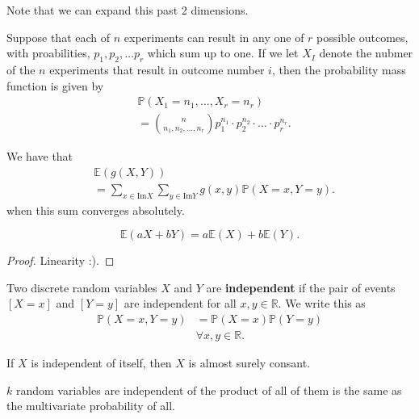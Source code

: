Note that we can expand this past 2 dimensions.

\begin{definition}
	Suppose that each of \( n \) experiments can result in any one of \( r \) possible outcomes, with proabilities, \( p_{1}, p_{2}, \ldots p_r \) which sum up to one. If we let \( X_I \) denote the nubmer of the \( n \) experiments that result in outcome number \( i \), then the probability mass function is given by 
	\begin{align*}
		&\mathbb{P}(X_{1}=n_{1},\ldots ,X_r=n_r) \\ &= \binom{n}{n_{1},n_{2},\ldots ,n_r} p_{1}^{n_{1}}  \cdot p_{2}^{n_{2}}  \cdot \ldots \cdot p_r^{n_r} 
	.\end{align*}
\end{definition}

\begin{definition}
	We have that
	\begin{align*}
		&\mathbb{E}(g(X,Y)) \\ &= \sum_{x \in \text{Im}X} \sum_{y \in \text{Im}Y} g(x,y)\mathbb{P}(X=x,Y=y)
	.\end{align*}
	when this sum converges absolutely.
\end{definition}

\begin{corollary}
	\[
		\mathbb{E}(aX + bY) = a\mathbb{E}(X) + b\mathbb{E}(Y)
	.\] 
\end{corollary}
\begin{proof}
	Linearity :).
\end{proof}

\begin{definition}
	Two discrete random variables \( X \) and \( Y \) are \textbf{independent} if the pair of events \( [X=x] \) and \( [Y=y] \) are independent for all \( x,y \in \mathbb{R} \). We write this as 
	\begin{align*}
		\mathbb{P}(X=x,Y=y) &= \mathbb{P}(X=x)\mathbb{P}(Y=y) \\ &\forall x,y \in \mathbb{R}
	.\end{align*}
\end{definition}

\begin{corollary}
	If \( X \) is independent of itself, then \( X \) is almost surely consant.
\end{corollary}

\begin{prop}
	\( k \) random variables are independent of the product of all of them is the same as the multivariate probability of all.
\end{prop}

